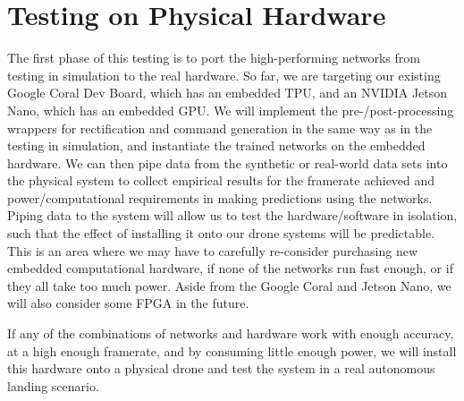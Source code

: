 \section{Testing on Physical Hardware}

The first phase of this testing is to port the high-performing networks from testing in simulation to the real hardware.
So far, we are targeting our existing Google Coral Dev Board, which has an embedded TPU,
and an NVIDIA Jetson Nano, which has an embedded GPU.
We will implement the pre-/post-processing wrappers for rectification and command generation in the same way as in the testing in simulation,
and instantiate the trained networks on the embedded hardware.
We can then pipe data from the synthetic or real-world data sets into the physical system
to collect empirical results
for the framerate achieved and power/computational requirements in making predictions
using the networks.
Piping data to the system will allow us to test the hardware/software in isolation,
such that the effect of installing it onto our drone systems will be predictable.
This is an area where we may have to carefully re-consider purchasing new embedded computational
hardware, if none of the networks run fast enough, or if they all take too much power.
Aside from the Google Coral and Jetson Nano, we will also consider some FPGA in the future.

If any of the combinations of networks and hardware work with enough accuracy,
at a high enough framerate, and by consuming little enough power,
we will install this hardware onto a physical drone and test the system in a real
autonomous landing scenario.